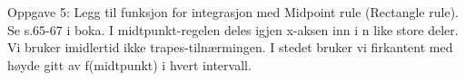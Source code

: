 %
%
Oppgave 5: Legg til funksjon for integrasjon med Midpoint rule (Rectangle rule).
Se s.65-67 i boka.
I midtpunkt-regelen deles igjen x-aksen inn i n like store deler.
Vi bruker imidlertid ikke trapes-tilnærmingen.
I stedet bruker vi firkantent med høyde gitt av f(midtpunkt) i hvert intervall.
